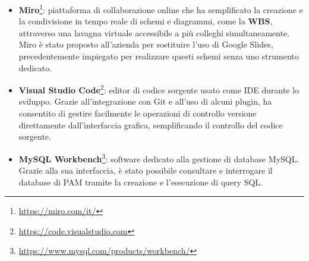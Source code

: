 \begin{itemize}
    \item \textbf{Miro}\footnote{\url{https://miro.com/it/}}: piattaforma di collaborazione online che ha semplificato la creazione e la condivisione in tempo reale di schemi e diagrammi, come la \textbf{\ac{WBS}},
    attraverso una lavagna virtuale accessibile a più colleghi simultaneamente. Miro è stato proposto all'azienda per sostituire l’uso di Google Slides, precedentemente impiegato
    per realizzare questi schemi senza uno strumento dedicato.
    \item \textbf{Visual Studio Code}\footnote{\url{https://code.visualstudio.com}}: editor di codice sorgente usato come IDE durante lo sviluppo. Grazie all'integrazione con Git e all'uso di alcuni plugin, ha consentito
    di gestire facilmente le operazioni di controllo versione direttamente dall’interfaccia grafica, semplificando il controllo del codice sorgente.
    \item \textbf{MySQL Workbench}\footnote{\url{https://www.mysql.com/products/workbench/}}: software dedicato alla gestione di database MySQL. Grazie alla sua interfaccia, è stato possibile consultare e interrogare il database di \ac{PAM}
    tramite la creazione e l’esecuzione di query SQL.
\end{itemize}

